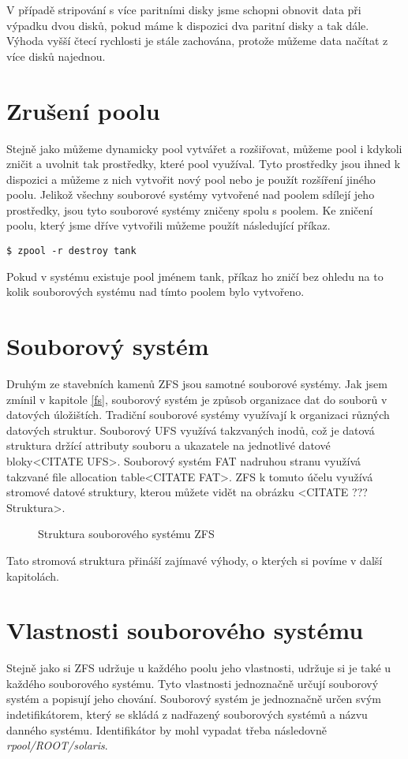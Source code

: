 V případě stripování s více paritními disky jsme schopni obnovit data při výpadku dvou disků, pokud máme k dispozici dva paritní disky a tak dále. Výhoda vyšší čtecí rychlosti je stále zachována, protože můžeme data načítat z více disků najednou.
\section{Zrušení poolu}
Stejně jako můžeme dynamicky pool vytvářet a rozšiřovat, můžeme pool i kdykoli zničit a uvolnit tak prostředky, které pool využíval. Tyto prostředky jsou ihned k dispozici a můžeme z nich vytvořit nový pool nebo je použít rozšíření jiného poolu. Jelikož všechny souborové systémy vytvořené nad poolem sdílejí jeho prostředky, jsou tyto souborové systémy zničeny spolu s poolem. Ke zničení poolu, který jsme dříve vytvořili můžeme použít následující příkaz.
\begin{verbatim}
$ zpool -r destroy tank
\end{verbatim}
Pokud v systému existuje pool jménem tank, příkaz ho zničí bez ohledu na to kolik souborových systému nad tímto poolem bylo vytvořeno.

\section{Souborový systém}
Druhým ze stavebních kamenů ZFS jsou samotné souborové systémy. Jak jsem zmínil v kapitole \ref{fs}, souborový systém je způsob organizace dat do souborů v datových úložištích.
Tradiční souborové systémy využívají k organizaci různých datových struktur. Souborový UFS využívá takzvaných inodů, což je datová struktura držící attributy souboru a ukazatele na jednotlivé datové bloky<CITATE UFS>. Souborový systém FAT nadruhou stranu využívá takzvané file allocation table<CITATE FAT>. ZFS k tomuto účelu využívá stromové datové struktury, kterou můžete vidět na obrázku <CITATE ??? Struktura>.
\begin{figure}[!h]
    \caption{Struktura souborového systému ZFS}
    \label{structure}
\end{figure}

Tato stromová struktura přináší zajímavé výhody, o kterých si povíme v další kapitolách.
\section{Vlastnosti souborového systému}
Stejně jako si ZFS udržuje u každého poolu jeho vlastnosti, udržuje si je také u každého souborového systému. Tyto vlastnosti jednoznačně určují souborový systém a popisují jeho chování. Souborový systém je jednoznačně určen svým indetifikátorem, který se skládá z nadřazený souborových systémů a názvu danného systému. Identifikátor by mohl vypadat třeba následovně \emph{rpool/ROOT/solaris}.

